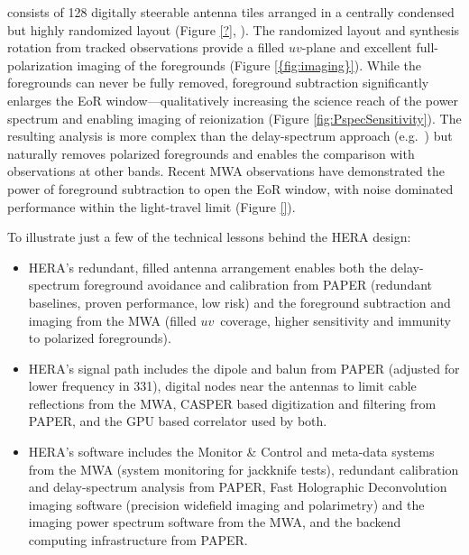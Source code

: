 \documentclass[preprint]{aastex}
\begin{document}
 consists of 128 digitally steerable antenna tiles arranged in a centrally condensed but highly randomized layout (Figure \ref{?}, \citealt{Tingay}). The randomized layout and synthesis rotation from tracked observations provide a filled $uv$-plane and excellent full-polarization imaging of the foregrounds (Figure \ref{{fig:imaging}}). While the foregrounds can never be fully removed, foreground subtraction significantly enlarges the EoR window---qualitatively increasing the science reach of the power spectrum and enabling imaging of reionization (Figure \ref{fig:PspecSensitivity}). The resulting analysis is more complex than the  delay-spectrum approach (e.g.\ \citealt{hazelton_et_al2013}) but naturally removes polarized foregrounds \citep{Moore} and enables the comparison with observations at other bands. Recent MWA observations have demonstrated the power of foreground subtraction to open the EoR window, with noise dominated performance within the light-travel limit (Figure \ref{}).

 To illustrate just a few of the technical lessons behind the HERA design:
\begin{itemize}
\setlength{\parskip}{0pt}
\vspace{-7pt}
\item HERA's redundant, filled antenna arrangement enables both the delay-spectrum foreground avoidance and calibration from PAPER (redundant baselines, proven performance, low risk) and the foreground subtraction and imaging from the MWA (filled $uv$~coverage, higher sensitivity and immunity to polarized foregrounds).
\item HERA's signal path includes the dipole and balun from PAPER (adjusted for lower frequency in 331), digital nodes near the antennas to limit cable reflections from the MWA, CASPER based digitization and filtering from PAPER, and the GPU based correlator used by both.
\item HERA's software includes the Monitor \& Control and meta-data systems from the MWA (system monitoring for jackknife tests), redundant calibration and delay-spectrum analysis from PAPER, Fast Holographic Deconvolution imaging software (precision widefield imaging and polarimetry) and the imaging power spectrum software from the MWA, and the backend computing infrastructure from PAPER.
\end{itemize}
\end{document}
